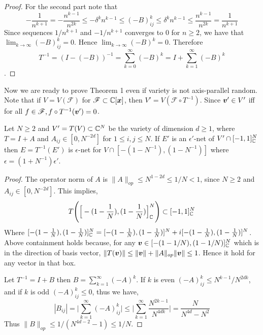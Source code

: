 {\begin{proof}
For the second part note that 
$$
-\frac{1}{n^{k+1}}=-\frac{n^{k-1}}{n^{2k}}\le -\delta^kn^{k-1}\le (-B)^k_{ij} \le \delta^kn^{k-1} \le \frac{n^{k-1}}{n^{2k}} =\frac{1}{n^{k+1}}
$$
Since sequences $1/n^{k+1}$ and $-1/n^{k+1}$ converges to $0$ for $n\ge2$, we have that $\lim_{k\to \infty} (-B)^k_{ij} = 0$. Hence $\lim_{k \to \infty} (-B)^k = 0$. Therefore 
$$
T^{-1} = (I-(-B))^{-1} = \sum_{k=0}^\infty(-B)^k=I+\sum_{k=1}^\infty(-B)^k
$$.
\end{proof}
\npara

Now we are ready to prove Theorem 1 even if variety is not axis-parallel random. Note that if $V=V(\mathscr{F})$ for $\mathscr{F}\subset \mathbb{C}[\bm x]$, then $V'=V(\mathscr{F}\circ T^{-1})$. Since $\bm v' \in V'$ iff for all $f \in \mathscr{F},f\circ T^{-1}(\bm v')=0$.
\begin{theorem}
Let $N\ge 2$ and $V' = T(V)\subset \mathbb{C}^N$ be the variety of dimension $d\ge 1$, where $T=I+A$ and $A_{ij}\in [0,N^{-2d}]$ for $1\le i,j\le N$. If $E'$ is an $\epsilon'$-net of $V' \cap [-1,1]^N_{\mathbb{C}}$ then $E=T^{-1}(E')$ is $\epsilon$-net for $V\cap [-(1-N^{-1}),(1-N^{-1})]$ where $\epsilon = (1+N^{-1})\epsilon'$.
\end{theorem}
\thmpara
\begin{proof}
The operator norm of $A$ is $\|A\|_{op}\le N^{1-2d} \le 1/N <1$, since $N\ge2$ and $A_{ij} \in [0,N^{-2d}]$. This implies, 
$$
T\Bigg(\Big[-(1-\frac{1}{N}),(1-\frac{1}{N})\Big]^N_{\mathbb{C}}\Bigg) \subset [-1,1]^N_{\mathbb{C}}
$$
Where $[-(1-\frac{1}{N}),(1-\frac{1}{N})]^N_{\mathbb{C}}=[-(1-\frac{1}{N}),(1-\frac{1}{N})]^N+i[-(1-\frac{1}{N}),(1-\frac{1}{N})]^N$. Above containment holds because, for any $\bm v\in [-(1-1/N),(1-1/N)]^N_{\mathbb{C}}$ which is in the direction of basis vector, $\|T(\bm v)\| \le \|\bm v\| + \|A\|_{op}\|\bm v\| \le 1$. Hence it hold for any vector in that box. 
\npara

Let $T^{-1} = I + B$ then $B = \sum_{k=1}^{\infty}(-A)^k$. If $k$ is even $(-A)_{ij}^k\le N^{k-1}/N^{2dk}$, and if $k$ is odd $(-A)_{ij}^k\le 0$, thus we have,
$$
|B_{ij}| = \Big|\sum_{k=1}^{\infty}(-A)^k_{ij}\Big|\le\Big|\sum_{k=1}^{\infty}\frac{N^{2k-1}}{N^{4dk}}\Big|=\frac{N}{N^{4d}-N^2}
$$
Thus $\|B\|_{op}\le 1/(N^{4d-2}-1)\le 1/N$. 


\end{proof}}
